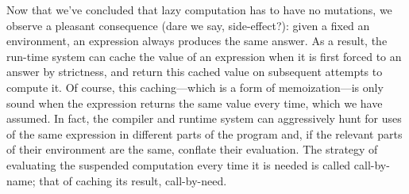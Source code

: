 
Now that we’ve concluded that lazy computation has to have no mutations, we
observe a pleasant consequence (dare we say, side-effect?): given a fixed an
environment, an expression always produces the same answer. As a result, the
run-time system can cache the value of an expression when it is first forced to
an answer by strictness, and return this cached value on subsequent attempts to
compute it. Of course, this caching—which is a form of memoization—is only sound
when the expression returns the same value every time, which we have assumed. In
fact, the compiler and runtime system can aggressively hunt for uses of the same
expression in different parts of the program and, if the relevant parts of their
environment are the same, conflate their evaluation. The strategy of evaluating
the suspended computation every time it is needed is called call-by-name; that
of caching its result, call-by-need.
